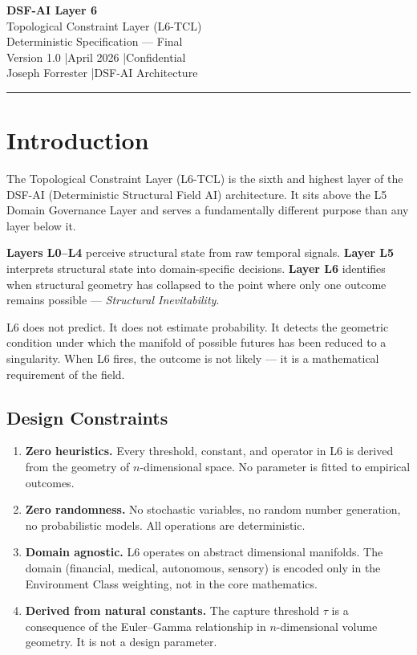 \documentclass[11pt, a4paper]{article}
\begin{document}
\begin{center}
  {\LARGE \textbf{DSF-AI Layer 6}}\\[6pt]
  {\large Topological Constraint Layer (L6-TCL)}\\[4pt]
  {\large Deterministic Specification --- Final}\\[8pt]
  {\color{tfe-gray}\small Version 1.0 \quad|\quad April 2026 \quad|\quad Confidential}\\[4pt]
  {\color{tfe-gray}\small Joseph Forrester \quad|\quad DSF-AI Architecture}
\end{center}

\vspace{1em}
\hrule
\vspace{1em}

\section{Introduction}

The Topological Constraint Layer (L6-TCL) is the sixth and highest layer of
the DSF-AI (Deterministic Structural Field AI) architecture. It sits above the
L5 Domain Governance Layer and serves a fundamentally different purpose than
any layer below it.

\textbf{Layers L0--L4} perceive structural state from raw temporal signals.
\textbf{Layer L5} interprets structural state into domain-specific decisions.
\textbf{Layer L6} identifies when structural geometry has collapsed to the
point where only one outcome remains possible --- \textit{Structural Inevitability}.

L6 does not predict. It does not estimate probability. It detects the geometric
condition under which the manifold of possible futures has been reduced to a
singularity. When L6 fires, the outcome is not likely --- it is a mathematical
requirement of the field.

\subsection{Design Constraints}

\begin{enumerate}[label=\arabic*.]
  \item \textbf{Zero heuristics.} Every threshold, constant, and operator in L6
        is derived from the geometry of $n$-dimensional space. No parameter is
        fitted to empirical outcomes.
  \item \textbf{Zero randomness.} No stochastic variables, no random number
        generation, no probabilistic models. All operations are deterministic.
  \item \textbf{Domain agnostic.} L6 operates on abstract dimensional manifolds.
        The domain (financial, medical, autonomous, sensory) is encoded only in
        the Environment Class weighting, not in the core mathematics.
  \item \textbf{Derived from natural constants.} The capture threshold $\tau$ is
        a consequence of the Euler--Gamma relationship in $n$-dimensional
        volume geometry. It is not a design parameter.
\end{enumerate}
\end{document}
